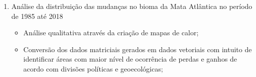 \begin{enumerate}
    \item Análise da distribuição das mudanças no bioma da Mata Atlântica no período de 1985 até 2018
    
    \begin{itemize}
        \item Análise qualitativa através da criação de mapas de calor;
    \end{itemize}

    \begin{itemize}
        \item Conversão dos dados matriciais gerados em dados vetoriais com intuito de identificar áreas com maior nível de ocorrência de perdas e ganhos de acordo com divisões políticas e geoecológicas;
    \end{itemize}

\end{enumerate}